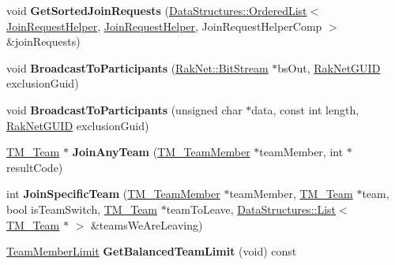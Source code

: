 \begin{DoxyCompactItemize}
\item 
\hypertarget{class_rak_net_1_1_t_m___world_ac3e1396474558004cdeeddeb01105550}{void {\bfseries Get\-Sorted\-Join\-Requests} (\hyperlink{class_data_structures_1_1_ordered_list}{Data\-Structures\-::\-Ordered\-List}$<$ \hyperlink{struct_rak_net_1_1_t_m___world_1_1_join_request_helper}{Join\-Request\-Helper}, \hyperlink{struct_rak_net_1_1_t_m___world_1_1_join_request_helper}{Join\-Request\-Helper}, Join\-Request\-Helper\-Comp $>$ \&join\-Requests)}\label{class_rak_net_1_1_t_m___world_ac3e1396474558004cdeeddeb01105550}

\item 
\hypertarget{class_rak_net_1_1_t_m___world_a5c7807e0020bc840d8f34b09491bef99}{void {\bfseries Broadcast\-To\-Participants} (\hyperlink{class_rak_net_1_1_bit_stream}{Rak\-Net\-::\-Bit\-Stream} $\ast$bs\-Out, \hyperlink{struct_rak_net_1_1_rak_net_g_u_i_d}{Rak\-Net\-G\-U\-I\-D} exclusion\-Guid)}\label{class_rak_net_1_1_t_m___world_a5c7807e0020bc840d8f34b09491bef99}

\item 
\hypertarget{class_rak_net_1_1_t_m___world_a7b6c9a80a0c64c419d531f03b8f138ff}{void {\bfseries Broadcast\-To\-Participants} (unsigned char $\ast$data, const int length, \hyperlink{struct_rak_net_1_1_rak_net_g_u_i_d}{Rak\-Net\-G\-U\-I\-D} exclusion\-Guid)}\label{class_rak_net_1_1_t_m___world_a7b6c9a80a0c64c419d531f03b8f138ff}

\item 
\hypertarget{class_rak_net_1_1_t_m___world_a4b44d48ab9a284427114422a7c51d6c8}{\hyperlink{class_rak_net_1_1_t_m___team}{T\-M\-\_\-\-Team} $\ast$ {\bfseries Join\-Any\-Team} (\hyperlink{class_rak_net_1_1_t_m___team_member}{T\-M\-\_\-\-Team\-Member} $\ast$team\-Member, int $\ast$result\-Code)}\label{class_rak_net_1_1_t_m___world_a4b44d48ab9a284427114422a7c51d6c8}

\item 
\hypertarget{class_rak_net_1_1_t_m___world_ad2d840cd4b8aeeb9a68bc2400fc00af7}{int {\bfseries Join\-Specific\-Team} (\hyperlink{class_rak_net_1_1_t_m___team_member}{T\-M\-\_\-\-Team\-Member} $\ast$team\-Member, \hyperlink{class_rak_net_1_1_t_m___team}{T\-M\-\_\-\-Team} $\ast$team, bool is\-Team\-Switch, \hyperlink{class_rak_net_1_1_t_m___team}{T\-M\-\_\-\-Team} $\ast$team\-To\-Leave, \hyperlink{class_data_structures_1_1_list}{Data\-Structures\-::\-List}$<$ \hyperlink{class_rak_net_1_1_t_m___team}{T\-M\-\_\-\-Team} $\ast$ $>$ \&teams\-We\-Are\-Leaving)}\label{class_rak_net_1_1_t_m___world_ad2d840cd4b8aeeb9a68bc2400fc00af7}

\item 
\hypertarget{class_rak_net_1_1_t_m___world_aefd243033a45a7353300c151e4b4217a}{\hyperlink{group___t_e_a_m___m_a_n_a_g_e_r___g_r_o_u_p_ga236290d3c5e0d6b3b4559ba851f02bed}{Team\-Member\-Limit} {\bfseries Get\-Balanced\-Team\-Limit} (void) const }\label{class_rak_net_1_1_t_m___world_aefd243033a45a7353300c151e4b4217a}

\end{DoxyCompactItemize}

